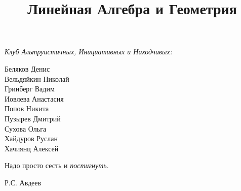 \documentclass[a4paper, 12pt]{article}
\title{Линейная Алгебра и Геометрия}
\author{}
\date{}
\begin{document}
\maketitle



\begin{flushleft}
\textit{Клуб Альтруистичных, Инициативных и Находчивых:}

\small{Беляков Денис \\Вельдяйкин Николай \\Гринберг Вадим\\ Иовлева Анастасия\\ Попов Никита \\Пузырев Дмитрий \\Сухова Ольга \\Хайдуров Руслан\\ Хачиянц Алексей}
\end{flushleft}

\epigraph{Надо просто сесть и \textit{постигнуть}.}
{Р.С. Авдеев}




\end{document}
